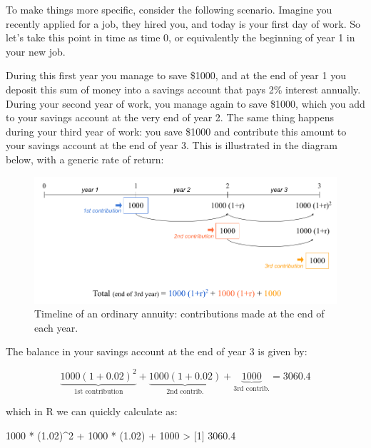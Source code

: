 \documentclass[
]{book}
\newenvironment{Shaded}{\begin{snugshade}}{\end{snugshade}}
\newcommand{\DecValTok}[1]{\textcolor[rgb]{0.00,0.00,0.81}{#1}}
\newcommand{\FloatTok}[1]{\textcolor[rgb]{0.00,0.00,0.81}{#1}}
\newcommand{\NormalTok}[1]{#1}
\newcommand{\SpecialCharTok}[1]{\textcolor[rgb]{0.00,0.00,0.00}{#1}}
\begin{document}
To make things more specific, consider the following scenario. Imagine you
recently applied for a job, they hired you, and today is your first day of work.
So let's take this point in time as time 0, or equivalently the beginning of
year 1 in your new job.

During this first year you manage to save \$1000, and at the end of year 1 you
deposit this sum of money into a savings account that pays 2\% interest annually.
During your second year of work, you manage again to save \$1000, which you
add to your savings account at the very end of year 2. The same thing happens
during your third year of work: you save \$1000 and contribute this amount to
your savings account at the end of year 3. This is illustrated in the
diagram below, with a generic rate of return:

\begin{figure}

{\centering \includegraphics[width=0.95\linewidth]{images/conditionals/timeline-ord-annuity} 

}

\caption{Timeline of an ordinary annuity: contributions made at the end of each year.}\label{fig:unnamed-chunk-255}
\end{figure}

The balance in your savings account at the end of year 3 is given by:

\[
\underbrace{1000 (1 + 0.02)^2}_{\text{1st contribution}} + \underbrace{1000 (1 + 0.02)}_{\text{2nd contrib.}} + \underbrace{1000}_{\text{3rd contrib.}} = 3060.4
\]

which in R we can quickly calculate as:

\begin{Shaded}
\begin{Highlighting}[]
\DecValTok{1000} \SpecialCharTok{*}\NormalTok{ (}\FloatTok{1.02}\NormalTok{)}\SpecialCharTok{\^{}}\DecValTok{2} \SpecialCharTok{+} \DecValTok{1000} \SpecialCharTok{*}\NormalTok{ (}\FloatTok{1.02}\NormalTok{) }\SpecialCharTok{+} \DecValTok{1000}
\SpecialCharTok{\textgreater{}}\NormalTok{ [}\DecValTok{1}\NormalTok{] }\FloatTok{3060.4}
\end{Highlighting}
\end{Shaded}
\end{document}

